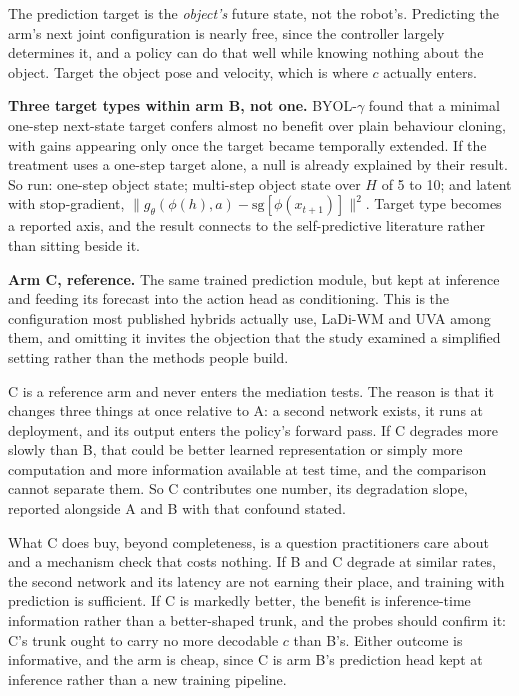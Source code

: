 \documentclass[9pt]{extarticle}
\begin{document}
The prediction target is the \emph{object's} future state, not the robot's. Predicting the arm's next joint configuration is nearly free, since the controller largely determines it, and a policy can do that well while knowing nothing about the object. Target the object pose and velocity, which is where $c$ actually enters.

\textbf{Three target types within arm B, not one.} BYOL-$\gamma$ found that a minimal one-step next-state target confers almost no benefit over plain behaviour cloning, with gains appearing only once the target became temporally extended. If the treatment uses a one-step target alone, a null is already explained by their result. So run: one-step object state; multi-step object state over $H$ of 5 to 10; and latent with stop-gradient, $\|g_\theta(\phi(h),a) - \mathrm{sg}[\phi(x_{t+1})]\|^2$. Target type becomes a reported axis, and the result connects to the self-predictive literature rather than sitting beside it.

\textbf{Arm C, reference.} The same trained prediction module, but kept at inference and feeding its forecast into the action head as conditioning. This is the configuration most published hybrids actually use, LaDi-WM and UVA among them, and omitting it invites the objection that the study examined a simplified setting rather than the methods people build.

C is a reference arm and never enters the mediation tests. The reason is that it changes three things at once relative to A: a second network exists, it runs at deployment, and its output enters the policy's forward pass. If C degrades more slowly than B, that could be better learned representation or simply more computation and more information available at test time, and the comparison cannot separate them. So C contributes one number, its degradation slope, reported alongside A and B with that confound stated.

What C does buy, beyond completeness, is a question practitioners care about and a mechanism check that costs nothing. If B and C degrade at similar rates, the second network and its latency are not earning their place, and training with prediction is sufficient. If C is markedly better, the benefit is inference-time information rather than a better-shaped trunk, and the probes should confirm it: C's trunk ought to carry no more decodable $c$ than B's. Either outcome is informative, and the arm is cheap, since C is arm B's prediction head kept at inference rather than a new training pipeline.
\end{document}
